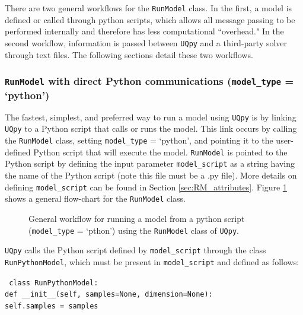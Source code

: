 \noindent There are two general workflows for the \texttt{RunModel} class. In the first, a model is defined or called through python scripts, which allows all message passing to be performed internally  and therefore has less computational ``overhead." In the second workflow, information is passed between \texttt{UQpy} and a third-party solver through text files. The following sections detail these two workflows.

\subsubsection{\texttt{RunModel} with direct Python communications (\texttt{model\_type} = `python')}

The fastest, simplest, and preferred way to run a model using \texttt{UQpy} is by linking \texttt{UQpy} to a Python script that calls or runs the model. This link occurs by calling the \texttt{RunModel} class, setting \texttt{model\_type} = `python', and pointing it to the user-defined Python script that will execute the model. \texttt{RunModel} is pointed to the Python script by defining the input parameter \texttt{model\_script} as a string having the name of the Python script (note this file must be a .py file). More details on defining \texttt{model\_script} can be found in Section \ref{sec:RM_attributes}. Figure \ref{fig:RunModel_Python} shows a general flow-chart for the \texttt{RunModel} class.
\begin{figure}[!ht]
	\caption{General workflow for running a model from a python script (\texttt{model\_type} = `pthon') using the \texttt{RunModel} class of \texttt{UQpy}.}
	\label{fig:RunModel_Python}
\end{figure}

\texttt{UQpy} calls the Python script defined by \texttt{model\_script} through the class \texttt{RunPythonModel}, which must be present in \texttt{model\_script} and defined as follows:

\vspace{4mm}
\texttt{{\color{blue} class} \texttt{RunPythonModel:}}\\

\hspace{1cm} \texttt{def \_\_init\_\_(self, samples=None, dimension=None):}\\

\hspace{1cm} \texttt{self.samples = samples}

